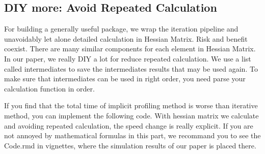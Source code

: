 \documentclass[
]{article}
\begin{document}
\hypertarget{diy-more-avoid-repeated-calculation}{%
\subsection{DIY more: Avoid Repeated
Calculation}\label{diy-more-avoid-repeated-calculation}}

For building a generally useful package, we wrap the iteration pipeline
and unavoidably let alone detailed calculation in Hessian Matrix. Risk
and benefit coexist. There are many similar components for each element
in Hessian Matrix. In our paper, we really DIY a lot for reduce repeated
calculation. We use a list called intermediates to save the
intermediates results that may be used again. To make sure that
intermediates can be used in right order, you need parse your
calculation function in order.

If you find that the total time of implicit profiling method is worse
than iterative method, you can implement the following code. With
hessian matrix we calculate and avoiding repeated calculation, the speed
change is really explicit. If you are not annoyed by mathematical
formulas in this part, we recommand you to see the Code.rmd in
vignettes, where the simulation results of our paper is placed there.
\end{document}

